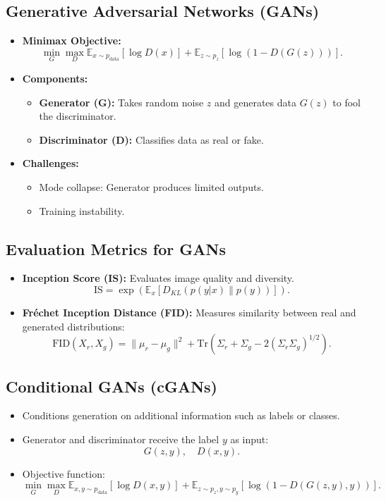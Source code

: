 \documentclass[12pt,a4paper]{article}
\begin{document}
\subsection{Generative Adversarial Networks (GANs)}
\begin{itemize}
    \item \textbf{Minimax Objective:}
    \[ \min_G \max_D \mathbb{E}_{x \sim p_{\text{data}}} [\log D(x)] + \mathbb{E}_{z \sim p_z} [\log(1 - D(G(z)))]. \]
    \item \textbf{Components:}
    \begin{itemize}
        \item \textbf{Generator (G):} Takes random noise $z$ and generates data $G(z)$ to fool the discriminator.
        \item \textbf{Discriminator (D):} Classifies data as real or fake.
    \end{itemize}
    \item \textbf{Challenges:}
    \begin{itemize}
        \item Mode collapse: Generator produces limited outputs.
        \item Training instability.
    \end{itemize}
\end{itemize}
\subsection{Evaluation Metrics for GANs}
\begin{itemize}
    \item \textbf{Inception Score (IS):} Evaluates image quality and diversity.
    \[ \text{IS} = \exp\left(\mathbb{E}_x[D_{KL}(p(y|x) \| p(y))]\right). \]
    \item \textbf{Fréchet Inception Distance (FID):} Measures similarity between real and generated distributions:
    \[ \text{FID}(X_r, X_g) = \|\mu_r - \mu_g\|^2 + \text{Tr}(\Sigma_r + \Sigma_g - 2(\Sigma_r \Sigma_g)^{1/2}). \]
\end{itemize}
\subsection{Conditional GANs (cGANs)}
\begin{itemize}
    \item Conditions generation on additional information such as labels or classes.
    \item Generator and discriminator receive the label $y$ as input:
    \[ G(z, y), \quad D(x, y). \]
    \item Objective function:
    \[ \min_G \max_D \mathbb{E}_{x,y \sim p_{\text{data}}} [\log D(x, y)] + \mathbb{E}_{z \sim p_z, y \sim p_y} [\log(1 - D(G(z, y), y))]. \]
\end{itemize}
\end{document}
